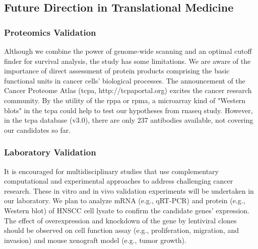 \documentclass[jpm,article,submit,moreauthors,pdftex]{Definitions/mdpi}
\newenvironment{MyColorPar}[1]{%
    \leavevmode\color{#1}\ignorespaces%
}{%
}%
\begin{document}
\begin{paracol}{2}
\subsection{Future Direction in Translational Medicine}




\subsubsection{Proteomics Validation}

Although we combine the power of genome-wide scanning and an optimal cutoff finder for survival analysis, the study has some limitations.
We are aware of the importance of direct assessment of protein products comprising the basic functional units in cancer cells' biological processes.
The announcement of the Cancer Proteome Atlas (\acrshort{tcpa}, http://tcpaportal.org) excites the cancer research community\cite{Li2013c}\cite{Li2017b}. By the utility of the \acrfull{rppa} or \acrfull{rpma}, a microarray kind of "Western blots" in the \acrshort{tcpa} could help to test our hypotheses from \acrshort{rnaseq} study.
However, in the \acrshort{tcpa} database (v3.0\cite{Chen2019}), there are only 237 antibodies available, not covering our candidates so far. %



\subsubsection{Laboratory Validation}
It is encouraged for multidisciplinary studies that use complementary computational and experimental approaches to address challenging cancer research.
These in vitro and in vivo validation experiments will be undertaken in our laboratory.
We plan to analyze mRNA (e.g., qRT-PCR) and protein (e.g., Western blot) of HNSCC cell lysate to confirm the candidate genes' expression.
The effect of overexpression and knockdown of the gene by lentiviral clones should be observed on cell function assay (e.g., proliferation, migration, and invasion) and mouse xenograft model (e.g., tumor growth). %


\end{paracol}
\end{document}
